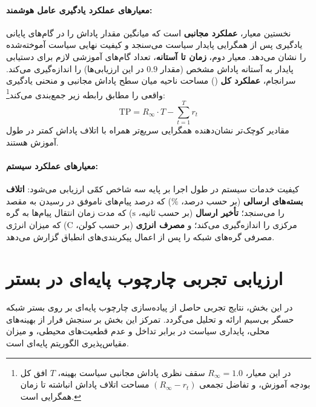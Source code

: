 \documentclass[oneside,openany,phd]{TMU-Thesis}
\begin{document}
\paragraph{معیارهای عملکرد یادگیری عامل هوشمند:}
نخستین معیار، \textbf{عملکرد مجانبی} است که میانگین مقدار پاداش را در گام‌های پایانی یادگیری پس از همگرایی پایدار سیاست می‌سنجد و کیفیت نهایی سیاست آموخته‌شده را نشان می‌دهد. معیار دوم، \textbf{زمان تا آستانه}، تعداد گام‌های آموزشی لازم برای دستیابی پایدار به آستانه پاداش مشخص (مقدار $0.9$ در این ارزیابی‌ها) را اندازه‌گیری می‌کند. سرانجام، \textbf{عملکرد کل} () مساحت ناحیه میان سطح پاداش مجانبی و منحنی یادگیری واقعی را مطابق رابطه زیر جمع‌بندی می‌کند\footnote{در این معیار، $R_{\infty} = 1.0$ سقف نظری پاداش مجانبی سیاست بهینه، $T$ افق کل بودجه آموزش، و تفاضل تجمعی $(R_{\infty} - r_t)$ مساحت اتلاف پاداش انباشته تا زمان همگرایی است.}:
\begin{equation}
\label{eq:total_performance_metric}
\mathrm{TP} = R_{\infty}\cdot T - \sum_{t=1}^{T} r_t
\end{equation}
مقادیر کوچک‌تر  نشان‌دهنده همگرایی سریع‌تر همراه با اتلاف پاداش کمتر در طول آموزش هستند.

\paragraph{معیارهای عملکرد سیستم:}
کیفیت خدمات سیستم در طول اجرا بر پایه سه شاخص کمّی ارزیابی می‌شود: \textbf{اتلاف بسته‌های ارسالی} (بر حسب درصد، $\%$)  که درصد پیام‌های ناموفق در رسیدن به مقصد را می‌سنجد؛ \textbf{تأخیر ارسال} (بر حسب ثانیه، $\text{s}$)  که مدت زمان انتقال پیام‌ها به گره مرکزی را اندازه‌گیری می‌کند؛ و \textbf{مصرف انرژی} (بر حسب کولن، $\text{C}$)  که میزان انرژی مصرفی گره‌های شبکه را پس از اعمال پیکربندی‌های انطباق گزارش می‌دهد.

\section{ارزیابی تجربی چارچوب پایه‌ای  در بستر }
\label{sec:deltaiot_foundational_eval}

در این بخش، نتایج تجربی حاصل از پیاده‌سازی چارچوب پایه‌ای  بر روی بستر شبکه حسگر بی‌سیم  ارائه و تحلیل می‌گردد. تمرکز این بخش بر سنجش فرار از بهینه‌های محلی، پایداری سیاست در برابر تداخل و عدم قطعیت‌های محیطی، و میزان مقیاس‌پذیری الگوریتم پایه‌ای است.
\end{document}
